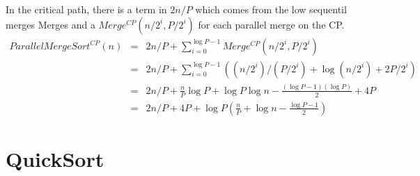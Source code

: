 \documentclass{article}
\begin{document}
In the critical path, there is a term in $2 n/P$ which comes from the
low sequentil merges Merges and a $Merge^{CP}(n/2^i,P/2^i)$ for each
parallel merge on the CP.
\begin{align}
  ParallelMergeSort^{CP}(n) & = & 2n/P + \sum_{i=0}^{\log P-1} Merge^{CP}(n/2^i,P/2^i) \\
  & = & 2n/P + \sum_{i=0}^{\log P-1} \left ( (n/2^i)/(P/2^i) + \log (n/2^i) + 2P/2^i \right )\\
  & = & 2n/P + \frac{n}{P} \log P  + \log P \log n - \frac{(\log P - 1)(\log P)}{2}  + 4P \\
  & = & 2n/P + 4P + \log P \left ( \frac{n}{P}   +  \log n - \frac{\log P - 1}{2}  \right )
\end{align}

\section{QuickSort}
\end{document}

